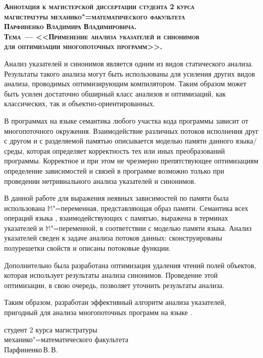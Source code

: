 \documentclass[12pt]{article}
\begin{document}
  \thispagestyle{empty}

  \begin{center}
    \scshape \bfseries
    Аннотация к магистерской диссертации студента 2 курса\\
    магистратуры механико"=математического факультета\\
    Парфиненко Владимира Владимировича.\\
    Тема~--- <<Применение анализа указателей и синонимов\\
    для оптимизации многопоточных программ>>.\par
  \end{center}
  \vspace{0.5cm}

  Анализ указателей и синонимов является одним из видов статического анализа.
  Результаты такого анализа могут быть использованы для усиления других видов
  анализа, проводимых оптимизирующим компилятором.
  Таким образом может быть усилен достаточно обширный класс анализов и
  оптимизаций, как классических, так и объектно-ориентированных.

  В программах на языке  семантика любого участка кода программы
  зависит от многопоточного окружения.
  Взаимодействие различных потоков исполнения друг с другом и с разделяемой
  памятью описывается моделью памяти данного языка\slash{}среды, которая
  определяет корректность тех или иных преобразований программы.
  Корректное и при этом не чрезмерно препятствующее оптимизациям определение
  зависимостей и связей в программе возможно только при проведении
  нетривиального анализа указателей и синонимов.

  В данной работе для выражения неявных зависимостей по памяти была
  использована $\mathbb{M}$"=переменная, представляющая образ памяти.
  Семантика всех операций языка , взаимодействующих с памятью,
  выражена в терминах указателей и $\mathbb{M}$"=переменной, в соответствии с
  моделью памяти языка.
  Анализ указателей сведен к задаче анализа потоков данных: сконструированы
  полурешетки свойств и описаны потоковые функции.

  Дополнительно была разработана оптимизация удаления чтений полей объектов,
  которая использует результаты анализа синонимов.
  Проведение этой оптимизации, в свою очередь, позволяет уточнить результаты
  анализа.

  Таким образом, разработан эффективный алгоритм анализа указателей, пригодный
  для анализа многопоточных программ на языке .

  \vspace{0.5cm}

  \begin{flushright}
    студент 2 курса магистратуры\\
    механико"=математического факультета\\
    Парфиненко\,В.\,В.\par
  \end{flushright}
\end{document}

